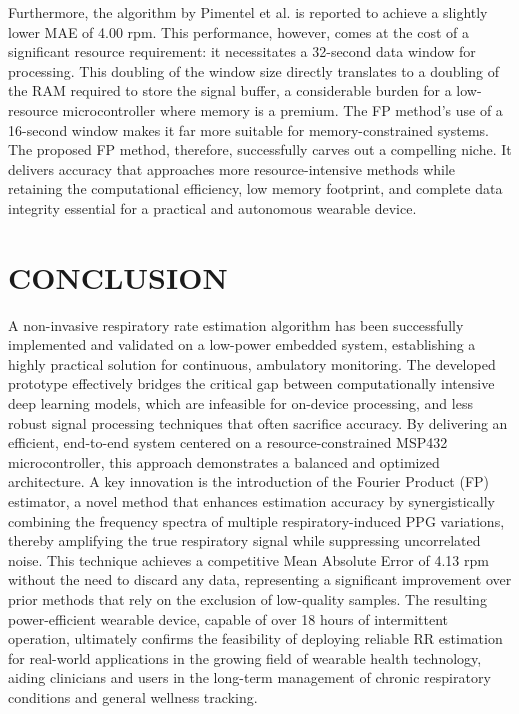 \documentclass[12pt,a4paper]{report}
\begin{document}
 Furthermore, the algorithm by Pimentel et al. is reported to achieve a slightly lower MAE of 4.00 rpm. This performance, however, comes at the cost of a significant resource requirement: it necessitates a 32-second data window for processing. This doubling of the window size directly translates to a doubling of the RAM required to store the signal buffer, a considerable burden for a low-resource microcontroller where memory is a premium. The FP method's use of a 16-second window makes it far more suitable for memory-constrained systems.\\
 
 The proposed FP method, therefore, successfully carves out a compelling niche. It delivers accuracy that approaches more resource-intensive methods while retaining the computational efficiency, low memory footprint, and complete data integrity essential for a practical and autonomous wearable device.



\chapter{ \Large CONCLUSION}

A non-invasive respiratory rate estimation algorithm has been successfully implemented and validated on a low-power embedded system, establishing a highly practical solution for continuous, ambulatory monitoring. The developed prototype effectively bridges the critical gap between computationally intensive deep learning models, which are infeasible for on-device processing, and less robust signal processing techniques that often sacrifice accuracy. By delivering an efficient, end-to-end system centered on a resource-constrained MSP432 microcontroller, this approach demonstrates a balanced and optimized architecture. A key innovation is the introduction of the Fourier Product (FP) estimator, a novel method that enhances estimation accuracy by synergistically combining the frequency spectra of multiple respiratory-induced PPG variations, thereby amplifying the true respiratory signal while suppressing uncorrelated noise. This technique achieves a competitive Mean Absolute Error of 4.13 rpm without the need to discard any data, representing a significant improvement over prior methods that rely on the exclusion of low-quality samples. The resulting power-efficient wearable device, capable of over 18 hours of intermittent operation, ultimately confirms the feasibility of deploying reliable RR estimation for real-world applications in the growing field of wearable health technology, aiding clinicians and users in the long-term management of chronic respiratory conditions and general wellness tracking.


 
\end{document}
